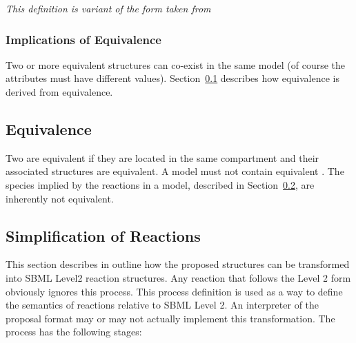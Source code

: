\documentclass{cekarticle}
\begin{document}
\emph{This definition is variant of the form taken from
\citep{rudolf:1998}}

\subsubsection{Implications of  Equivalence}

Two or more equivalent  structures can co-exist
in the same model (of course the  attributes must have
different values).  Section~\ref{sec:species-equals} describes how
 equivalence is derived from 
equivalence.

\subsection{ Equivalence}
\label{sec:species-equals}

Two  are equivalent if they are located in the same
compartment and their associated  structures
are equivalent.  A model must not contain equivalent
. The species implied by the reactions in a model,
described in Section~\ref{sec:reaction-simplification}, are
inherently not equivalent.

\subsection{Simplification of Reactions}
\label{sec:reaction-simplification}

This section describes in outline how the proposed
 structures can be transformed into SBML Level2
reaction structures.  Any reaction that follows the Level 2 form
obviously ignores this process.  This process definition is used
as a way to define the semantics of reactions relative to SBML
Level 2.  An interpreter of the proposal format may or may not
actually implement this transformation.  The process has the
following stages:
\end{document}
